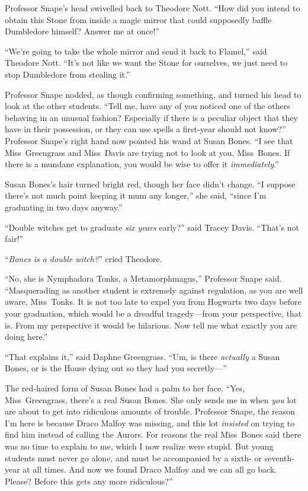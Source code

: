 Professor Snape’s head swivelled back to Theodore Nott.
“How did you intend to obtain this Stone from inside a magic mirror that could supposedly baffle Dumbledore himself? Answer me at once!”

“We’re going to take the whole mirror and send it back to Flamel,” said Theodore Nott.
“It’s not like we want the Stone for ourselves, we just need to stop Dumbledore from stealing it.”

Professor Snape nodded, as though confirming something, and turned his head to look at the other students.
“Tell me, have any of you noticed one of the others behaving in an unusual fashion? Especially if there is a peculiar object that they have in their possession, or they can use spells a first-year should not know?” Professor Snape’s right hand now pointed his wand at Susan Bones.
“I see that Miss~Greengrass and Miss~Davis are trying not to look at you, Miss~Bones. If there is a mundane explanation, you would be wise to offer it \emph{immediately}.”

Susan Bones’s hair turned bright red, though her face didn’t change.
“I suppose there’s not much point keeping it mum any longer,” she said, “since I’m graduating in two days anyway.”

“Double witches get to graduate \emph{six years} early?” said Tracey Davis.
“That’s not fair!”

“\emph{Bones is a double witch?}” cried Theodore.

“No, she is Nymphadora Tonks, a Metamorphmagus,” Professor Snape said.
“Masquerading as another student is extremely against regulation, as you are well aware, Miss~Tonks. It is not too late to expel you from Hogwarts two days before your graduation, which would be a dreadful tragedy—from your perspective, that is. From my perspective it would be hilarious. Now tell me what exactly you are doing here.”

“That explains it,” said Daphne Greengrass.
“Um, is there \emph{actually} a Susan Bones, or is the House dying out so they had you secretly—”

The red-haired form of Susan Bones had a palm to her face.
“Yes, Miss~Greengrass, there’s a real Susan Bones. She only sends me in when \emph{you} lot are about to get into ridiculous amounts of trouble. Professor Snape, the reason I’m here is because Draco Malfoy was missing, and this lot \emph{insisted} on trying to find him instead of calling the Aurors. For reasons the real Miss~Bones said there was no time to explain to me, which I now realize were stupid. But young students must never go alone, and must be accompanied by a sixth- or seventh-year at all times. And now we found Draco Malfoy and we can all go back. Please? Before this gets any more ridiculous?”


